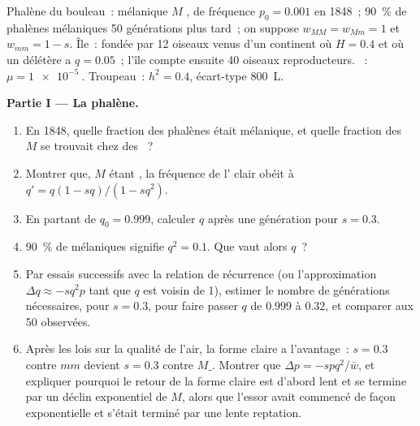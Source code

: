 \begin{problem}
\label{pb:b2:population-genetics:1}
Phalène du bouleau~:  mélanique $M$ , de fréquence $p_0 = 0.001$
en 1848~; \qty{90}{\%} de phalènes mélaniques 50 générations plus tard~;
on suppose
$w_{MM} = w_{Mm} = 1$ et $w_{mm} = 1 - s$. Île~: fondée par 12
oiseaux venus d'un continent où $H = 0.4$ et où un  
délétère a $q = 0.05$~; l'île compte ensuite 40 oiseaux
reproducteurs. ~: $\mu = \qty{1e-5}{}$. Troupeau~: $h^{2} = 0.4$,
écart-type \qty{800}{L}.

\medskip
\noindent\textbf{Partie I --- La phalène.}
\begin{enumerate}
  \item En 1848, quelle fraction des phalènes était mélanique, et quelle
        fraction des  $M$ se trouvait chez des ~?
  \item Montrer que, $M$ étant , la fréquence de l' clair
        obéit à $q' = q(1 - sq)/(1 - sq^{2})$.
  \item En partant de $q_0 = 0.999$, calculer $q$ après une génération
        pour $s = 0.3$.
  \item \qty{90}{\%} de mélaniques signifie $q^{2} = 0.1$. Que vaut alors $q$~?
  \item Par essais successifs avec la relation de récurrence (ou
        l'approximation
        $\Delta q \approx -sq^{2}p$ tant que $q$ est voisin de 1), estimer le
        nombre de générations nécessaires, pour $s = 0.3$, pour faire
        passer $q$ de $0.999$
        à $0.32$, et comparer aux 50 observées.
  \item Après les lois sur la qualité de l'air, la forme claire a
        l'avantage~: $s
        = 0.3$ contre $mm$ devient $s = 0.3$ contre $M\_$. Montrer
        que $\Delta p = -spq^{2}/\bar w$, et expliquer pourquoi le retour
        de la forme claire est d'abord lent et se termine par un déclin
        exponentiel de $M$, alors que l'essor avait commencé de façon
        exponentielle et s'était terminé par une lente reptation.
\end{enumerate}


\end{problem}
